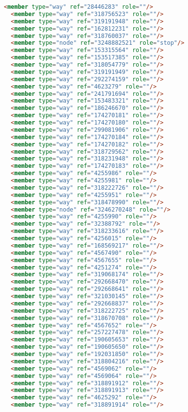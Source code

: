 \begin{lstlisting}[language=HTML,basicstyle=\tiny,caption=test.xml]
  <member type="way" ref="28446283" role=""/>
  <member type="way" ref="318756523" role=""/>
  <member type="way" ref="319191948" role=""/>
  <member type="way" ref="162812231" role=""/>
  <member type="way" ref="318760037" role=""/>
  <member type="node" ref="3248882521" role="stop"/>
  <member type="way" ref="153315564" role=""/>
  <member type="way" ref="153517385" role=""/>
  <member type="way" ref="318054779" role=""/>
  <member type="way" ref="319191949" role=""/>
  <member type="way" ref="292274159" role=""/>
  <member type="way" ref="4623279" role=""/>
  <member type="way" ref="241791694" role=""/>
  <member type="way" ref="153483321" role=""/>
  <member type="way" ref="186246670" role=""/>
  <member type="way" ref="174270181" role=""/>
  <member type="way" ref="174270180" role=""/>
  <member type="way" ref="299081906" role=""/>
  <member type="way" ref="174270184" role=""/>
  <member type="way" ref="174270182" role=""/>
  <member type="way" ref="318729562" role=""/>
  <member type="way" ref="318231948" role=""/>
  <member type="way" ref="174270183" role=""/>
  <member type="way" ref="4255986" role=""/>
  <member type="way" ref="4255981" role=""/>
  <member type="way" ref="318222726" role=""/>
  <member type="way" ref="4255951" role=""/>
  <member type="way" ref="318478990" role=""/>
  <member type="node" ref="3246270248" role=""/>
  <member type="way" ref="4255990" role=""/>
  <member type="way" ref="32388792" role=""/>
  <member type="way" ref="318233616" role=""/>
  <member type="way" ref="4256015" role=""/>
  <member type="way" ref="168569217" role=""/>
  <member type="way" ref="4567490" role=""/>
  <member type="way" ref="4567655" role=""/>
  <member type="way" ref="4251274" role=""/>
  <member type="way" ref="319068174" role=""/>
  <member type="way" ref="292668470" role=""/>
  <member type="way" ref="292668641" role=""/>
  <member type="way" ref="321030145" role=""/>
  <member type="way" ref="292668837" role=""/>
  <member type="way" ref="318222725" role=""/>
  <member type="way" ref="318670708" role=""/>
  <member type="way" ref="4567652" role=""/>
  <member type="way" ref="257227478" role=""/>
  <member type="way" ref="190605653" role=""/>
  <member type="way" ref="190605650" role=""/>
  <member type="way" ref="192031850" role=""/>
  <member type="way" ref="318804216" role=""/>
  <member type="way" ref="4569062" role=""/>
  <member type="way" ref="4569064" role=""/>
  <member type="way" ref="318891912" role=""/>
  <member type="way" ref="318891913" role=""/>
  <member type="way" ref="4625292" role=""/>
  <member type="way" ref="318891914" role=""/>

\end{lstlisting}
